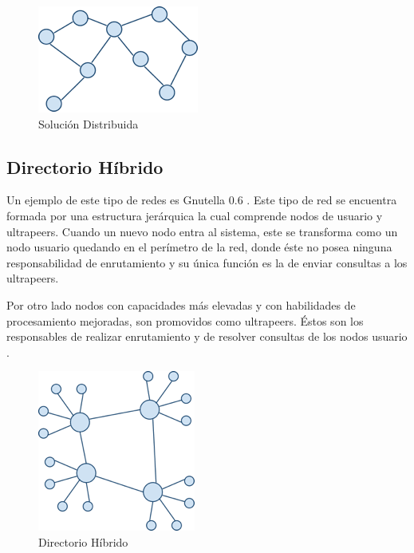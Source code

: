\begin{figure}[h]
  \centering
    \includegraphics[scale=1]{gfx/p2p_distribuido}
  \caption{Solución Distribuida}
  \label{conexionhttp}
\end{figure}


\subsection{Directorio Híbrido}

Un ejemplo de este tipo de redes es Gnutella 0.6 \cite{sanghi}. Este tipo de red se encuentra formada por una estructura jerárquica la cual comprende nodos de usuario y ultrapeers. Cuando un nuevo nodo entra al sistema, este se transforma como un nodo usuario quedando en el perímetro de la red, donde éste no posea ninguna responsabilidad de enrutamiento y su única función es la de enviar consultas a los ultrapeers. 

Por otro lado nodos con capacidades más elevadas y con habilidades de procesamiento mejoradas, son promovidos como ultrapeers. Éstos son los responsables de realizar enrutamiento y de resolver consultas de los nodos usuario \cite{sanghi}. 

\begin{figure}[h]
  \centering
    \includegraphics[scale=1]{gfx/p2p_dir_centralizado}
  \caption{Directorio Híbrido}
  \label{conexionhttp}
\end{figure}


